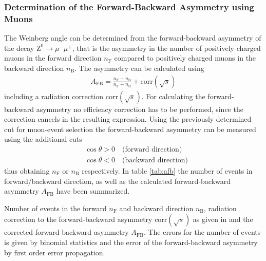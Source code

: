 \documentclass[11pt, a4paper]{article}
\numberwithin{equation}{section}
\begin{document}
\subsubsection{Determination of the Forward-Backward Asymmetry using Muons}
The Weinberg angle can be determined from the forward-backward asymmetry of the decay $\mathrm{Z}^0 \rightarrow \mu^- \mu^+$, that is the asymmetry in the number of positively charged muons in the forward direction $n_\mathrm{F}$ compared to positively charged muons in the backward direction $n_\mathrm{B}$.
The asymmetry can be calculated using
\begin{align*}
	A_\mathrm{FB} = \frac{n_\mathrm{F} - n_\mathrm{B}}{n_\mathrm{F} + n_\mathrm{B}} + \mathrm{corr}(\sqrt{s})
\end{align*}
including a radiation correction $\mathrm{corr}(\sqrt{s})$.
For calculating the forward-backward asymmetry no efficiency correction has to be performed, since the correction cancels in the resulting expression.
Using the previously determined cut for muon-event selection the forward-backward asymmetry can be measured using the additional cuts 
\begin{align*}
	&\cos\theta > 0 \quad \text{(forward direction)} \\
	&\cos\theta < 0 \quad \text{(backward direction)}
\end{align*}
thus obtaining $n_\mathrm{F}$ or $n_\mathrm{B}$ respectively.
In table \ref{tab:afb} the number of events in forward/backward direction, as well as the calculated forward-backward asymmetry $A_\mathrm{FB}$ have been summarized.
\begin{table}[h]
	\centering
	
	\caption{Number of events in the forward $n_\mathrm{F}$ and backward direction $n_\mathrm{B}$, radiation correction to the forward-backward asymmetry $\mathrm{corr}(\sqrt{s})$ as given in \cite{anleitung} and the corrected forward-backward asymmetry $A_\mathrm{FB}$. The errors for the number of events is given by binomial statistics and the error of the forward-backward asymmetry by first order error propagation.}
	\label{tab:afb}
\end{table}
\end{document}
